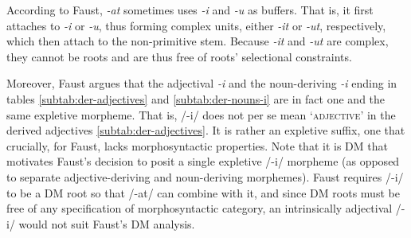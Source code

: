 According to Faust, \textit{-at} sometimes uses \textit{-i} and 
\textit{-u} as buffers. That is, it first attaches to \textit{-i} or \textit{-u}, 
thus forming complex units, either \emph{-it} or \emph{-ut}, respectively, 
which then attach to
the non-primitive stem. Because \emph{-it} and \emph{-ut} are complex, 
they cannot be roots and are thus free of roots' selectional constraints.

Moreover, Faust argues that the adjectival \textit{-i} and 
the noun-deriving \textit{-i} ending in tables 
\ref{subtab:der-adjectives} and \ref{subtab:der-nouns-i} 
are in fact one and the same expletive morpheme. That is, 
/-i/ does not per se mean `\textsc{adjective}' in the derived adjectives 
\ref{subtab:der-adjectives}. It is rather an expletive suffix, one that 
crucially, for Faust, lacks morphosyntactic properties.
Note that it is \ac{DM} that motivates Faust's decision to posit a single 
expletive /-i/ morpheme (as opposed to 
separate adjective-deriving and noun-deriving morphemes).  Faust 
requires /-i/ to be a \ac{DM} root so that /-at/ can combine with it, and since 
\ac{DM} roots must be free of any specification of morphosyntactic 
category, an intrinsically adjectival /-i/ would
not suit Faust's \ac{DM} analysis. 

